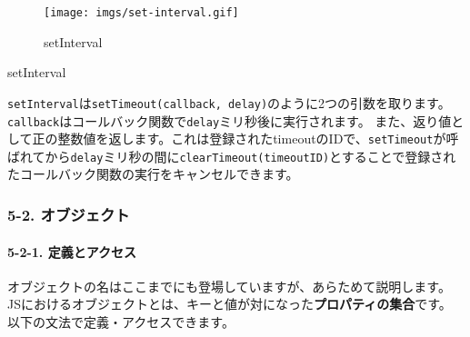 \begin{Shaded}
\begin{Highlighting}[]
\NormalTok{(() }\KeywordTok{=\textgreater{}}\NormalTok{ \{}
  \OperatorTok{=}  \NormalTok{()}\OperatorTok{;}
  \OperatorTok{;}
\NormalTok{\}}\OperatorTok{,}  \OperatorTok{*} \NormalTok{)}\OperatorTok{;}
\end{Highlighting}
\end{Shaded}

\begin{figure}
\centering
\texttt{[image: imgs/set-interval.gif]}
\caption{setInterval}
\end{figure}

setInterval

\texttt{setInterval}は\texttt{setTimeout(callback,\ delay)}のように2つの引数を取ります。
\texttt{callback}はコールバック関数で\texttt{delay}ミリ秒後に実行されます。
また、返り値として正の整数値を返します。これは登録されたtimeoutのIDで、\texttt{setTimeout}が呼ばれてから\texttt{delay}ミリ秒の間に\texttt{clearTimeout(timeoutID)}とすることで登録されたコールバック関数の実行をキャンセルできます。

\subsubsection{5-2.
オブジェクト}\label{ux30aaux30d6ux30b8ux30a7ux30afux30c8}

\paragraph{5-2-1.
定義とアクセス}\label{ux5b9aux7fa9ux3068ux30a2ux30afux30bbux30b9}

オブジェクトの名はここまでにも登場していますが、あらためて説明します。
JSにおけるオブジェクトとは、キーと値が対になった\textbf{プロパティの集合}です。
以下の文法で定義・アクセスできます。

\begin{Shaded}
\begin{Highlighting}[]
\OperatorTok{=}\NormalTok{ \{}
  \OperatorTok{:} \OperatorTok{,}
  \OperatorTok{:} 
\NormalTok{\}}\OperatorTok{;}

\OperatorTok{,}\NormalTok{ obj[}\NormalTok{])}\OperatorTok{;}
\end{Highlighting}
\end{Shaded}

